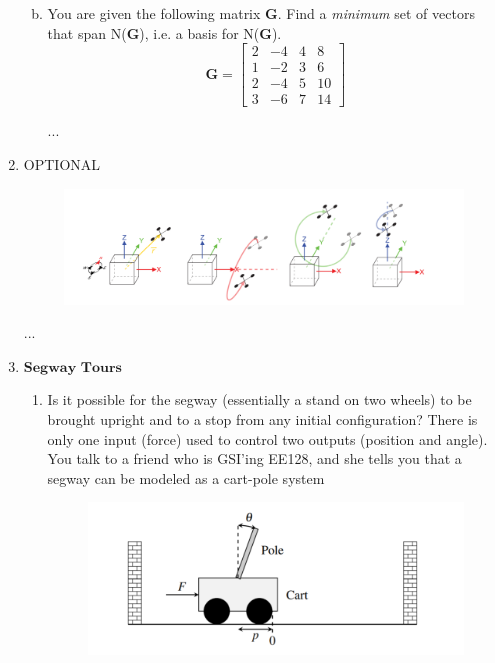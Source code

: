 \documentclass[11pt]{article}
\def\G{\textbf{G}}
\begin{document}
\begin{enumerate}
\begin{enumerate}[(a)]
	      		        
	      	\newpage
	      		        
	      	\item You are given the following matrix $\G$. Find a \textit{minimum} set of vectors that span N($\G$), i.e. a basis for N($\G$).
	      	      \[
	      	      	\G = \begin{bmatrix}
	      	      	2 & -4 & 4 & 8 \\
	      	      	1 & -2 & 3 & 6 \\
	      	      	2 & -4 & 5 & 10 \\
	      	      	3 & -6 & 7 & 14
	      	      	\end{bmatrix}
	      	      \]
	      	      \begin{Answer}
	      	      	...
	      	      \end{Answer}
	      \end{enumerate}
	      	      
	      \newpage
	      	      
	\item OPTIONAL
	      \begin{figure}[h]
	      	\centering
	      	\includegraphics[scale=0.9]{q7a}
	      \end{figure}
	      \begin{Answer}
	      	...
	      \end{Answer}
	      	      
	      	      
	      \newpage
	      	      
	\item $\textbf{Segway Tours}$
	      \begin{enumerate}
	      	\item Is it possible for the segway (essentially a stand on two wheels) to be brought upright and to a stop from any initial configuration? There is only one input (force) used to control two outputs (position and angle). You talk to a friend who is GSI'ing EE128, and she tells you that a segway can be modeled as a cart-pole system
	      	      \begin{figure}[h]
	      	      	\centering
	      	      	\includegraphics[scale=0.9]{q8a}
	      	      \end{figure}
	      	      	      	

\end{enumerate}
\end{enumerate}
\end{document}
